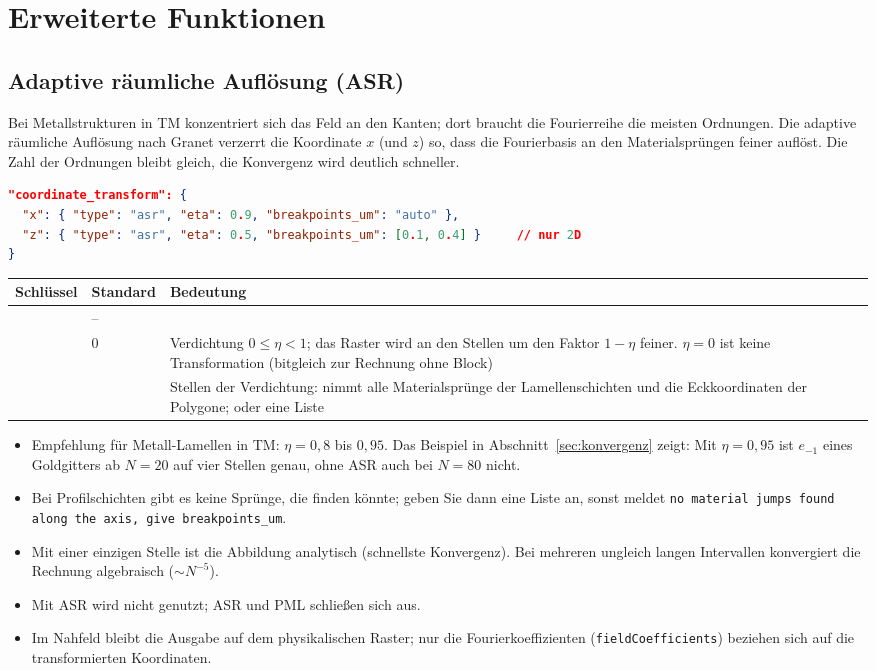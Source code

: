 \chapter{Erweiterte Funktionen}\label{ch:erweitert}

\section{Adaptive räumliche Auflösung (ASR)}\label{sec:asr}
%
Bei Metallstrukturen in TM konzentriert sich das Feld an den Kanten; dort braucht die Fourierreihe die meisten
Ordnungen. Die adaptive räumliche Auflösung nach Granet verzerrt die Koordinate $x$ (und $z$) so, dass die
Fourierbasis an den Materialsprüngen feiner auflöst. Die Zahl der Ordnungen bleibt gleich, die Konvergenz wird
deutlich schneller.
\begin{lstlisting}[language=json]
"coordinate_transform": {
  "x": { "type": "asr", "eta": 0.9, "breakpoints_um": "auto" },
  "z": { "type": "asr", "eta": 0.5, "breakpoints_um": [0.1, 0.4] }     // nur 2D
}
\end{lstlisting}
\begin{center}
\small
\begin{tabularx}{\linewidth}{llY}
\toprule
Schlüssel & Standard & Bedeutung \\
\midrule
{} & -- &  \\
 & 0 & Verdichtung $0\le\eta<1$; das Raster wird an den Stellen um den Faktor $1-\eta$ feiner. $\eta=0$ ist
keine Transformation (bitgleich zur Rechnung ohne Block) \\
 &  & Stellen der Verdichtung:  nimmt alle Materialsprünge der
Lamellenschichten und die Eckkoordinaten der Polygone; oder eine Liste \\
\bottomrule
\end{tabularx}
\end{center}
\begin{itemize}
  \item Empfehlung für Metall-Lamellen in TM: $\eta=0{,}8$ bis $0{,}95$. Das Beispiel in
        Abschnitt~\ref{sec:konvergenz} zeigt: Mit $\eta=0{,}95$ ist $e_{-1}$ eines Goldgitters ab $N=20$ auf vier Stellen
        genau, ohne ASR auch bei $N=80$ nicht.
  \item Bei Profilschichten gibt es keine Sprünge, die  finden könnte; geben Sie dann eine Liste an,
        sonst meldet \FG{} \texttt{no material jumps found along the axis, give breakpoints\_um}.
  \item Mit einer einzigen Stelle ist die Abbildung analytisch (schnellste Konvergenz). Bei mehreren ungleich langen
        Intervallen konvergiert die Rechnung algebraisch ($\sim N^{-5}$).
  \item Mit ASR wird  nicht genutzt; ASR und PML schließen sich aus.
  \item Im Nahfeld bleibt die Ausgabe auf dem physikalischen Raster; nur die Fourierkoeffizienten
        (\texttt{fieldCoefficients}) beziehen sich auf die transformierten Koordinaten.
\end{itemize}

